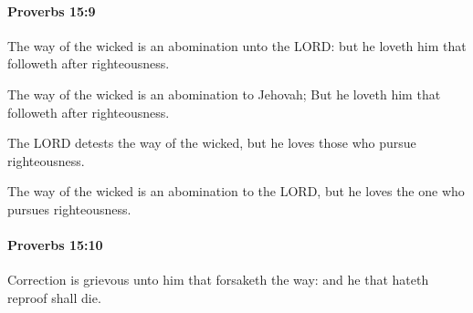 		\paragraph{Proverbs 15:9} %
			\label{PROVERBS-15-9}

			The way of the wicked is an abomination unto the LORD: but he loveth him that followeth after righteousness.

			\begin{versebox}
					\item[BHS] 
					\item[ASV] The way of the wicked is an abomination to Jehovah; But he loveth him that followeth after righteousness.
					\item[NIV] The LORD detests the way of the wicked, but he loves those who pursue righteousness.
					\item[NRSV] The way of the wicked is an abomination to the LORD, but he loves the one who pursues righteousness.
			\end{versebox}

		\paragraph{Proverbs 15:10} %
			\label{PROVERBS-15-10}

			Correction is grievous unto him that forsaketh the way: and he that hateth reproof shall die.

